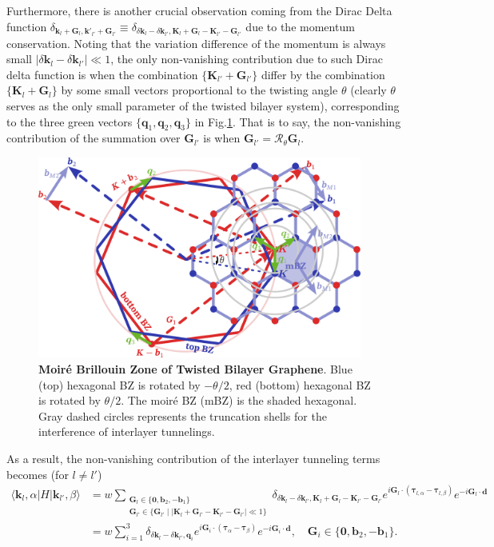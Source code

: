 Furthermore, there is another crucial observation coming from the Dirac Delta function $\delta_{\bm k_l+\bm G_l,\bm k'_{l'}+\bm G_{l'}}\equiv\delta_{\delta\bm k_l-\delta\bm k_{l'},\bm K_l+\bm G_l - \bm K_{l'}-\bm G_{l'}}$ due to the momentum conservation. Noting that the variation difference of the momentum is always small $|\delta\bm k_l-\delta\bm k_{l'}|\ll 1$, the only non-vanishing contribution due to such Dirac delta function is when the combination $\{\bm K_{l'}+\bm G_{l'}\}$ differ by the combination $\{\bm K_l+\bm G_l\}$ by some small vectors proportional to the twisting angle $\theta$ (clearly $\theta$ serves as the only small parameter of the twisted bilayer system), corresponding to the three green vectors $\{\bm q_1,\bm q_2,\bm q_3\}$ in Fig.\ref{fig:tBLG_geometry}. That is to say, the non-vanishing contribution of the summation over $\bm G_{l'}$ is when $\bm G_{l'}=\mathcal R_\theta\bm G_l$.

\begin{figure}[!htp]
    \centering
    \includegraphics[width=0.95\textwidth]{figures/tBLG_geometry.pdf}
    \caption{\textbf{Moir\'e Brillouin Zone of Twisted Bilayer Graphene}. Blue (top) hexagonal BZ is rotated by $-\theta/2$, red (bottom) hexagonal BZ is rotated by $\theta/2$. The moir\'e BZ (mBZ) is the shaded hexagonal. Gray dashed circles represents the truncation shells for the interference of interlayer tunnelings.}
    \label{fig:tBLG_geometry}
\end{figure}


As a result, the non-vanishing contribution of the interlayer tunneling terms becomes (for $l\neq l'$)
\begin{align*}
    \langle\bm k_l,\alpha|H|\bm k_{l'},\beta\rangle & =w\sum_{\substack{\bm G_l\in\{\bm 0,\bm b_2,-\bm b_1\}                                                                                                                            \\\bm G_{l'}\in\{\bm G_{l'}\mid|\bm K_l+\bm G_{l'}-\bm K_{l'}-\bm G_{l'}|\ll1\}}}\delta_{\delta\bm k_l-\delta\bm k_{l'},\bm K_l+\bm G_l-\bm K_{l'}-\bm G_{l'}}e^{i\bm G_l\cdot(\bm\tau_{l,\alpha}-\bm\tau_{l,\beta})}e^{-i\bm G_l\cdot\bm d}\\
                                                    & = w\sum_{i=1}^3\delta_{\delta \bm k_l-\delta\bm k_{l'},\bm q_i}e^{i\bm G_i\cdot(\bm\tau_\alpha-\bm\tau_\beta)}e^{-i\bm G_i\cdot\bm d},\quad \bm G_i\in\{\bm 0,\bm b_2,-\bm b_1\}.
\end{align*}



